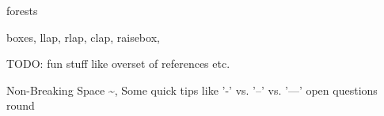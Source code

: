 \begin{frame}{\insertsection}
   forests
\end{frame}

\begin{frame}{\insertsection}
   boxes, llap, rlap, clap, raisebox,
\end{frame}



\begin{frame}
   \focusCfalse
   \begin{focus}
      \AllLearnings
   \end{focus}
\end{frame}

\appendix
\begin{frame}
   TODO: fun stuff like overset of references etc.
\end{frame}

\begin{frame}
   Non-Breaking Space \textasciitilde,
   Some quick tips like '-' vs. '--' vs. '---'
   open questions round
\end{frame}


